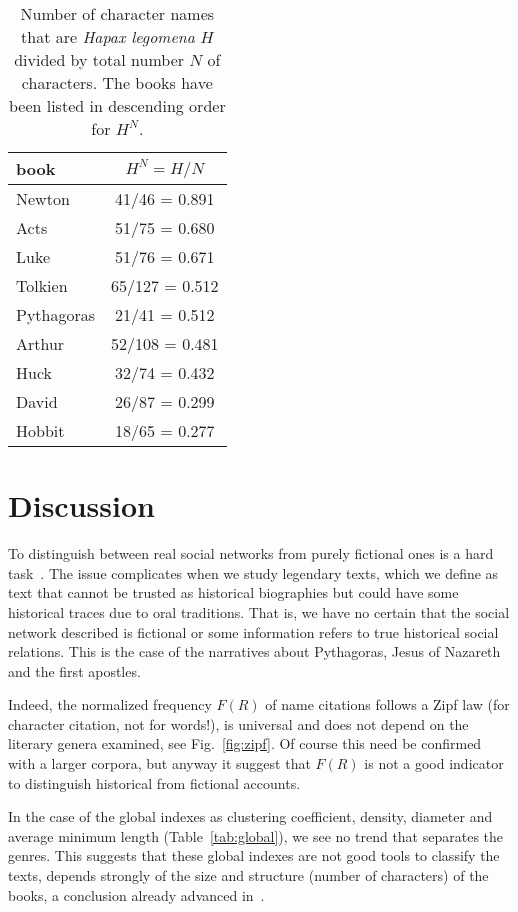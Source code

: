 \documentclass[review]{elsarticle}
\begin{document}
\begin{table}[ht]
\centering\small
\begin{tabular}{l|c}\hline
\bf\hfil book\hfil & \bf\hfil $H^N = H/N$\hfil\\ \hline
Newton & 41/46 = 0.891 \\
Acts & 51/75 = 0.680 \\
Luke & 51/76 = 0.671 \\
Tolkien & 65/127 = 0.512 \\
Pythagoras & 21/41 = 0.512 \\
Arthur & 52/108 = 0.481 \\
Huck & 32/74 = 0.432 \\
David & 26/87 = 0.299 \\
Hobbit & 18/65 = 0.277 \\
\hline
\end{tabular}
\caption{Number of character 
names that are \emph{Hapax legomena} $H$ divided by 
total number $N$ of characters. The books have been 
listed in descending order for $H^N$.}
\label{tab:hapax}
\end{table}

\section{Discussion}

To distinguish between real social networks 
from purely fictional ones is a hard
task~\cite{alberich2002marvel,gleiser2007become}. 
The issue complicates when we study legendary texts, which we define
as text that cannot be trusted as historical 
biographies but could have
some historical traces due to oral traditions. That is,
we have no certain that the social network described is
fictional or some information refers to true historical
social relations. This is the case of the narratives 
about Pythagoras, Jesus of Nazareth and the first apostles. 

Indeed, the normalized frequency $F(R)$ of name citations
follows a Zipf law (for character citation, not for words!), 
is universal and does not
depend on the literary genera examined, see Fig.~\ref{fig:zipf}.
Of course this need be confirmed with a larger corpora, but
anyway it suggest that $F(R)$ is not a good indicator 
to distinguish historical from fictional accounts.

In the case of the global indexes as 
clustering coefficient, density, diameter
and average minimum length (Table~\ref{tab:global}), we see no
trend that separates the genres. This
suggests that these global indexes are not good tools to classify
the texts, depends strongly of the size and structure
(number of characters) of the books, 
a conclusion already advanced
in~\cite{alberich2002marvel,gleiser2007become}.
\end{document}
